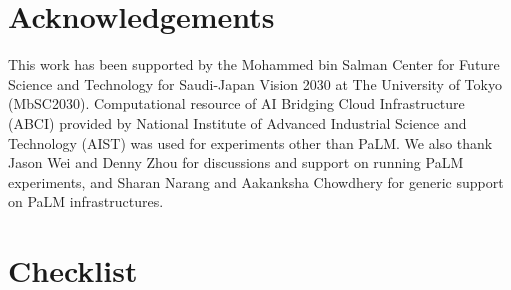 \documentclass{article}
\begin{document}

\section*{Acknowledgements}
This work has been supported by the Mohammed bin Salman Center for Future Science and Technology for Saudi-Japan Vision 2030 at The University of Tokyo (MbSC2030).
Computational resource of AI Bridging Cloud Infrastructure (ABCI) provided by National Institute of Advanced Industrial Science and Technology (AIST) was used for experiments other than PaLM. We also thank Jason Wei and Denny Zhou for discussions and support on running PaLM experiments, and Sharan Narang and Aakanksha Chowdhery for generic support on PaLM infrastructures.




\section*{Checklist}
\end{document}
